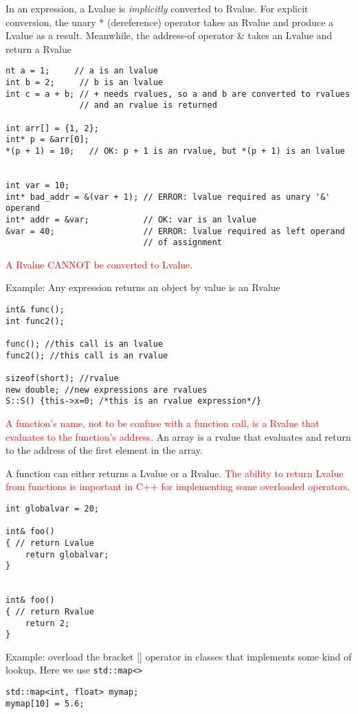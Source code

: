 In an expression, a Lvalue is {\it implicitly } converted to Rvalue. For
explicit conversion, the unary * (dereference) operator takes an Rvalue and
produce a Lvalue as a result. Meanwhile, the address-of operator \& takes an
Lvalue and return a Rvalue
\begin{verbatim}
nt a = 1;     // a is an lvalue
int b = 2;     // b is an lvalue
int c = a + b; // + needs rvalues, so a and b are converted to rvalues
               // and an rvalue is returned
               
int arr[] = {1, 2};
int* p = &arr[0];
*(p + 1) = 10;   // OK: p + 1 is an rvalue, but *(p + 1) is an lvalue


int var = 10;
int* bad_addr = &(var + 1); // ERROR: lvalue required as unary '&' operand
int* addr = &var;           // OK: var is an lvalue
&var = 40;                  // ERROR: lvalue required as left operand
                            // of assignment               
\end{verbatim}
\textcolor{red}{A Rvalue CANNOT be converted to Lvalue}.

Example: Any expression returns an object by value is an Rvalue
\begin{verbatim}
int& func();
int func2();

func(); //this call is an lvalue
func2(); //this call is an rvalue

sizeof(short); //rvalue
new double; //new expressions are rvalues
S::S() {this->x=0; /*this is an rvalue expression*/}
\end{verbatim}
\textcolor{red}{A function's name, not to be confuse with a function call, is a
Rvalue that evaluates to the function's address}. An array is a rvalue that
evaluates and return to the address of the first element in the array. 

A function can either returns a Lvalue or a Rvalue. \textcolor{red}{The ability
to return Lvalue from functions is important in C++ for implementing some
overloaded operators}.
\begin{verbatim}
int globalvar = 20;

int& foo()
{ // return Lvalue
    return globalvar;
}


int& foo()
{ // return Rvalue
    return 2;
}
\end{verbatim}

Example: overload the bracket [] operator in classes that implements some kind
of lookup. Here we use \verb!std::map<>!
\begin{verbatim}
std::map<int, float> mymap;
mymap[10] = 5.6;
\end{verbatim}

